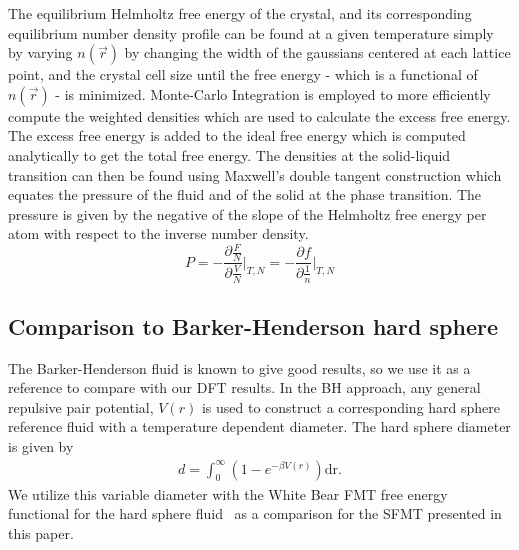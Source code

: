 \documentclass[letterpaper,twocolumn,amsmath,amssymb,prb]{revtex4-1}
\begin{document}
The equilibrium Helmholtz free energy of the crystal, and its corresponding equilibrium number density profile can be found at a given temperature simply by varying $n(\vec{r})$
by changing %
the width of the gaussians centered at each lattice point, and the crystal cell size until the free energy - which is a functional of $n(\vec{r})$ - is minimized. Monte-Carlo Integration is employed to more efficiently compute the weighted densities which are used to calculate the excess free energy. The excess free energy is added to the ideal free energy which is computed analytically to get the total free energy. The densities at the solid-liquid transition can then be found using Maxwell's double tangent construction which equates the pressure of the fluid and of the solid at the phase transition. The pressure is given by the negative of the slope of the Helmholtz free energy per atom with respect to the inverse number density. \begin{equation}{P=-\frac{\partial{\frac{F}{N}}}{\partial{\frac{V}{N}}}\bigg|_{T,N} = -\frac{\partial{f}}{\partial{\frac{1}{n}}}\bigg|_{T,N}}\end{equation} 




\subsection{Comparison to Barker-Henderson hard sphere}

The Barker-Henderson fluid is known to give good results, so we use it as a reference to compare with our DFT results. 
In the BH approach, any general
repulsive pair potential, $V(r)$ is used to construct a corresponding hard
sphere reference fluid with a temperature dependent diameter. The hard
sphere diameter is given by
\begin{align}
  d = \int_0^{\infty}\left( 1 - e^{-\beta V(r)} \right)\mathrm{dr}.
  \label{eq:bh-diameter}
\end{align}
We utilize this variable diameter with the White Bear FMT free energy
functional for the hard sphere fluid~\cite{roth2002whitebear} as a
comparison for the SFMT presented in this paper.
\end{document}
